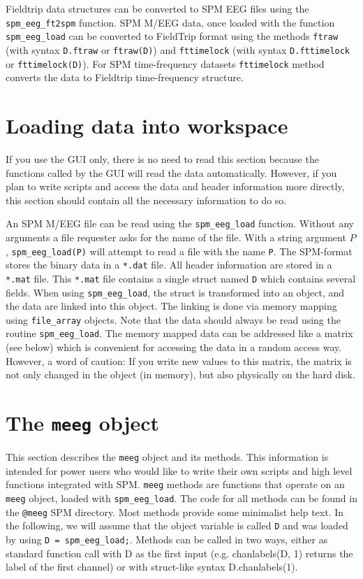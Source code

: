 Fieldtrip data structures can be converted to SPM EEG files using the \texttt{spm\_eeg\_ft2spm} function. SPM M/EEG data, once loaded with the function \texttt{spm\_eeg\_load} can be converted to FieldTrip format using the methods \texttt{ftraw} (with syntax \texttt{D.ftraw} or \texttt{ftraw(D)}) and \texttt{fttimelock} (with syntax \texttt{D.fttimelock} or \texttt{fttimelock(D)}). For SPM time-frequency datasets \texttt{fttimelock} method converts the data to Fieldtrip time-frequency structure.

\section{Loading data into workspace\label{sec:load}}
If you use the GUI only, there is no need to read this section because the functions called by the GUI will read the data automatically. However, if you plan to write scripts and access the data and header information more directly, this section should contain all the necessary information to do so.

An SPM M/EEG file can be read using the \texttt{spm\_eeg\_load} function. Without any arguments a file requester asks for the name of the file. With a string argument $P$, \texttt{spm\_eeg\_load(P)} will attempt to read a file with the name \texttt{P}. The SPM-format stores the binary data in a \texttt{*.dat} file. All header information are stored in a \texttt{*.mat} file. This \texttt{*.mat} file contains a single struct named \texttt{D} which contains several fields. When using \texttt{spm\_eeg\_load}, the struct is transformed into an object, and the data are linked into this object. The linking is done via memory mapping using \texttt{file\_array} objects. Note that the data should always be read using the routine \texttt{spm\_eeg\_load}. The memory mapped data can be addressed like a matrix (see below) which is convenient for accessing the data in a random access way. However, a word of caution: If you write new values to this matrix, the matrix is not only changed in the object (in memory), but also physically on the hard disk.

\section{The \texttt{meeg} object}
This section describes the \texttt{meeg} object and its methods. This information is intended for power users who would like to write their own scripts and high level functions integrated with SPM. \texttt{meeg} methods are functions that operate on an \texttt{meeg} object, loaded with \texttt{spm\_eeg\_load}. The code for all methods can be found in the \texttt{@meeg} SPM directory. Most methods provide some minimalist help text. In the following, we will assume that the object variable is called \texttt{D} and was  loaded by using \texttt{D = spm\_eeg\_load;}. Methods can be called in two ways, either as standard function call with D as the first input (e.g. chanlabels(D, 1) returns the label of the first channel) or with struct-like syntax D.chanlabels(1). 

